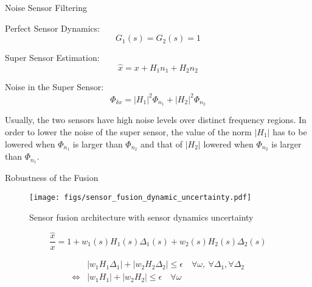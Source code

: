 \documentclass[t]{clean-beamer}
\begin{document}
\begin{frame}[label={sec:org1234068}]{Noise Sensor Filtering}
\label{sec:noise_filtering}

Perfect Sensor Dynamics:
\begin{equation}
\label{eq:perfect_dynamics}
  G_1(s) = G_2(s) = 1
\end{equation}

Super Sensor Estimation:
\begin{equation}
\label{eq:estimate_perfect_dyn}
  \hat{x} = x + H_1 n_1 + H_2 n_2
\end{equation}

Noise in the Super Sensor:
\begin{equation}
\label{eq:noise_filtering_psd}
  \Phi_{\delta x} = \left|H_1\right|^2 \Phi_{n_1} + \left|H_2\right|^2 \Phi_{n_2}
\end{equation}

Usually, the two sensors have high noise levels over distinct frequency regions.
In order to lower the noise of the super sensor, the value of the norm \(|H_1|\) has to be lowered when \(\Phi_{n_1}\) is larger than \(\Phi_{n_2}\) and that of \(|H_2|\) lowered when \(\Phi_{n_2}\) is larger than \(\Phi_{n_1}\).
\end{frame}

\begin{frame}[label={sec:org9e26d3e}]{Robustness of the Fusion}
\label{sec:fusion_robustness}

\begin{figure}[htbp]
\centering
\texttt{[image: figs/sensor\_fusion\_dynamic\_uncertainty.pdf]}
\caption{\label{fig:sensor_fusion_dynamic_uncertainty}
Sensor fusion architecture with sensor dynamics uncertainty}
\end{figure}

\begin{equation}
\label{eq:super_sensor_dyn_uncertainty}
  \frac{\hat{x}}{x} = 1 + w_1(s) H_1(s) \Delta_1(s) + w_2(s) H_2(s) \Delta_2(s)
\end{equation}

\begin{equation}
\label{eq:max_uncertainty_super_sensor}
  \begin{aligned}
    & \left|w_1 H_1 \Delta_1\right| + \left|w_2 H_2 \Delta_2\right| \le \epsilon \quad \forall\omega,\ \forall \Delta_1, \forall \Delta_2\\
    \Leftrightarrow & \left|w_1 H_1\right| + \left|w_2 H_2\right| \le \epsilon \quad \forall\omega
  \end{aligned}
\end{equation}
\end{frame}
\end{document}
